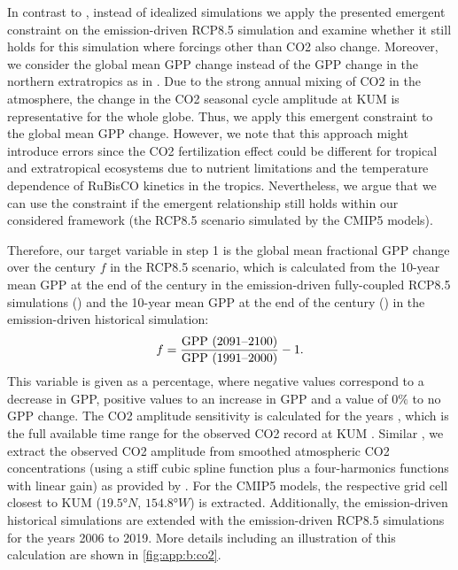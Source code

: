 In contrast to \textcite{Wenzel2016}, instead of idealized simulations we apply
the presented emergent constraint on the emission-driven \acs{RCP}8.5
simulation \autocite{Riahi2011} and examine whether it still holds for this
simulation where forcings other than \ac{CO2} also change. Moreover, we
consider the global mean \ac{GPP} change instead of the \ac{GPP} change in the
northern extratropics as in \textcite{Wenzel2016}. Due to the strong annual
mixing of \ac{CO2} in the atmosphere, the change in the \ac{CO2} seasonal cycle
amplitude at \ac{KUM} is representative for the whole globe. Thus, we apply
this emergent constraint to the global mean \ac{GPP} change. However, we note
that this approach might introduce errors since the \ac{CO2} fertilization
effect could be different for tropical and extratropical ecosystems due to
nutrient limitations and the temperature dependence of \ac{RuBisCO} kinetics
\autocite{CraftsBrandner2000} in the tropics. Nevertheless, we argue that we
can use the constraint if the emergent relationship still holds within our
considered framework (the \acs{RCP}8.5 scenario simulated by the \acs{CMIP}5
models).

Therefore, our target variable in step 1 is the global mean fractional
\acs{GPP} change over the  century $f$ in the \acs{RCP}8.5 scenario,
which is calculated from the 10-year mean \ac{GPP} at the end of the 
century in the emission‐driven fully-coupled \acs{RCP}8.5 simulations
() and the 10-year mean \ac{GPP} at the end of the 
century () in the emission-driven historical simulation:
\begin{equation}
  f = \frac{\textnormal{GPP (2091\textnormal{--}2100)}}{
    \textnormal{GPP (1991\textnormal{--}2000)}} - 1.
  \label{eq:06:f}
\end{equation}
This variable is given as a percentage, where negative values correspond to a
decrease in \ac{GPP}, positive values to an increase in \ac{GPP} and a value of
$0 \unit{\%}$ to no \ac{GPP} change. The \ac{CO2} amplitude sensitivity is
calculated for the years , which is the full available time
range for the observed \ac{CO2} record at \ac{KUM} \autocite{Keeling2005}.
Similar \textcite{Wenzel2016}, we extract the observed \ac{CO2} amplitude from
smoothed atmospheric \ac{CO2} concentrations (using a stiff cubic spline
function plus a four-harmonics functions with linear gain) as provided by
\textcite{Keeling2005}. For the \acs{CMIP}5 models, the respective grid cell
closest to \ac{KUM} ($19.5 \unit{\degree N}$, $154.8 \unit{\degree W}$) is
extracted. Additionally, the emission-driven historical simulations are
extended with the emission-driven \acs{RCP}8.5 simulations for the years 2006
to 2019. More details including an illustration of this calculation are shown
in \cref{fig:app:b:co2}.

